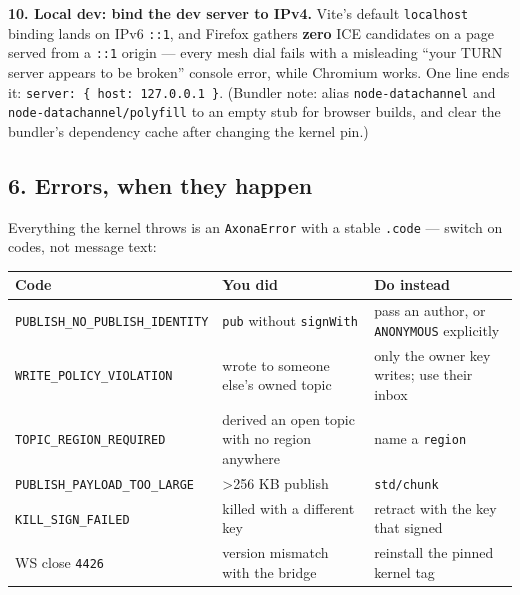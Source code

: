 \documentclass[
  nobib]{tufte-handout}
\newcounter{none} %
\begin{document}
\textbf{10. Local dev: bind the dev server to IPv4.} Vite's default
\texttt{localhost} binding lands on IPv6 \texttt{::1}, and Firefox
gathers \textbf{zero} ICE candidates on a page served from a
\texttt{::1} origin --- every mesh dial fails with a misleading ``your
TURN server appears to be broken'' console error, while Chromium works.
One line ends it:
\texttt{server:\ \{\ host:\ \textquotesingle{}127.0.0.1\textquotesingle{}\ \}}.
(Bundler note: alias \texttt{node-datachannel} and
\texttt{node-datachannel/polyfill} to an empty stub for browser builds,
and clear the bundler's dependency cache after changing the kernel pin.)

\subsection{6. Errors, when they happen}\label{errors-when-they-happen}

Everything the kernel throws is an \texttt{AxonaError} with a stable
\texttt{.code} --- switch on codes, not message text:

{\def\LTcaptype{none} %
\begin{longtable}[]{@{}
  >{\raggedright\arraybackslash}p{}
  >{\raggedright\arraybackslash}p{}
  >{\raggedright\arraybackslash}p{}@{}}
\toprule\noalign{}
\begin{minipage}[b]{\linewidth}\raggedright
Code
\end{minipage} & \begin{minipage}[b]{\linewidth}\raggedright
You did
\end{minipage} & \begin{minipage}[b]{\linewidth}\raggedright
Do instead
\end{minipage} \\
\midrule\noalign{}
\endhead
\bottomrule\noalign{}
\endlastfoot
\texttt{PUBLISH\_NO\_PUBLISH\_IDENTITY} & \texttt{pub} without
\texttt{signWith} & pass an author, or \texttt{ANONYMOUS} explicitly \\
\texttt{WRITE\_POLICY\_VIOLATION} & wrote to someone else's owned topic
& only the owner key writes; use their inbox \\
\texttt{TOPIC\_REGION\_REQUIRED} & derived an open topic with no region
anywhere & name a \texttt{region} \\
\texttt{PUBLISH\_PAYLOAD\_TOO\_LARGE} & \textgreater256 KB publish &
\texttt{std/chunk} \\
\texttt{KILL\_SIGN\_FAILED} & killed with a different key & retract with
the key that signed \\
WS close \texttt{4426} & version mismatch with the bridge & reinstall
the pinned kernel tag \\
\end{longtable}
}
\end{document}
